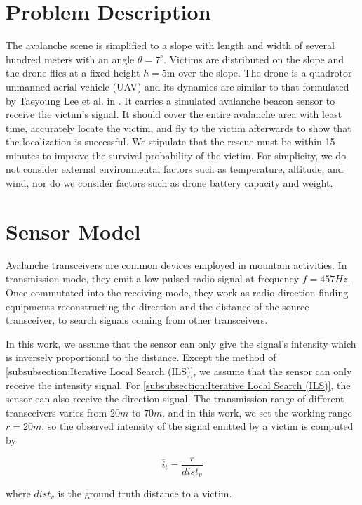 \documentclass[conference]{IEEEtran}
\begin{document}
\section{Problem Description}\label{section:Problem Description}
The avalanche scene is simplified to a slope with length and width of several hundred meters with an angle $ \theta = 7^{\circ}$. Victims are distributed on the slope and the drone flies at a fixed height $h=5$m over the slope.
The drone is a quadrotor unmanned aerial vehicle (UAV) and its dynamics are similar to that formulated by Taeyoung Lee et al. in \cite{5717652}. It carries a simulated avalanche beacon sensor to receive the victim's signal. It should cover the entire avalanche area with least time, accurately locate the victim, and fly to the victim afterwards to show that the localization is successful. We stipulate that the rescue must be within 15 minutes to improve the survival probability of the victim. For simplicity, we do not consider external environmental factors such as temperature, altitude, and wind, nor do we consider factors such as drone battery capacity and weight.


\section{Sensor Model}\label{section:Sensor Model}
Avalanche transceivers are common devices employed in mountain activities. In transmission mode, they emit a low pulsed radio signal at frequency $f = 457 Hz$. Once commutated into the receiving mode, they work as radio direction finding equipments reconstructing the direction and the distance of the source transceiver, to search signals coming from other transceivers.

In this work, we assume that the sensor can only give the signal's intensity which is inversely proportional to the distance. Except the method of \ref{subsubsection:Iterative Local Search (ILS)}, we assume that the sensor can only receive the intensity signal. For \ref{subsubsection:Iterative Local Search (ILS)}, the sensor can also receive the direction signal. The transmission range of different transceivers varies from $20m$ to $70m$. and in this work, we set the working range $r = 20m$, so the observed intensity of the signal emitted by a victim is computed by 

\begin{equation}
    \bar{i}_{t} = \frac{r}{dist_{v}}
\end{equation}

where $dist_{v}$ is the ground truth distance to a victim.
\end{document}
